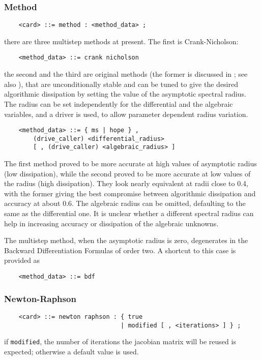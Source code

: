 \subsubsection{Method}
\begin{verbatim}
    <card> ::= method : <method_data> ;
\end{verbatim}
there are three multistep methods at present. 
The first is Crank-Nicholson:
\begin{verbatim}
    <method_data> ::= crank nicholson
\end{verbatim}
the second and the third are original 
methods (the former is discussed in \cite{MASARATI-LANZ-MANTEGAZZA-2001}; 
see also 
), 
that are unconditionally stable and can be tuned to give 
the desired algorithmic dissipation
by setting the value of the asymptotic spectral radius.
The radius can be set independently for the differential
and the algebraic variables, and a driver is used, to allow parameter 
dependent radius variation.
\begin{verbatim}
    <method_data> ::= { ms | hope } ,
        (drive_caller) <differential_radius>
        [ , (drive_caller) <algebraic_radius> ]
\end{verbatim}
The first method proved to be more accurate at high values of asymptotic
radius (low dissipation), while the second proved to be more accurate
at low values of the radius (high dissipation).
They look nearly equivalent at radii close to 0.4, with the former
giving the best compromise between algorithmic dissipation and accuracy 
at about 0.6.
The algebraic radius can be omitted, defaulting to the same 
as the differential one.
It is unclear whether a different spectral radius can help in increasing
accuracy or dissipation of the algebraic unknowns.

\noindent
The multistep method, when the asymptotic radius is zero, degenerates
in the Backward Differentiation Formulas of order two.
A shortcut to this case is provided as
\begin{verbatim}
    <method_data> ::= bdf
\end{verbatim}


\subsubsection{Newton-Raphson}
\begin{verbatim}
    <card> ::= newton raphson : { true 
                                | modified [ , <iterations> ] } ;
\end{verbatim}
if \texttt{modified}, the number of iterations the jacobian matrix will be
reused is expected; otherwise a default value is used.

